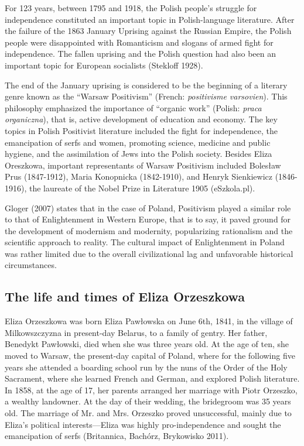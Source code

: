 For 123 years, between 1795 and 1918, the Polish people's struggle for independence constituted an important topic in Polish-language literature.
After the failure of the 1863 January Uprising against the Russian Empire, the Polish people were disappointed with Romanticism and slogans of armed fight for independence.
The fallen uprising and the Polish question had also been an important topic for European socialists
(Stekloff 1928).

The end of the January uprising is considered to be the beginning of a literary genre known as the ``Warsaw Positivism'' (French: \textit{positivisme varsovien}).
This philosophy emphasized the importance of ``organic work'' (Polish: \textit{praca organiczna}), that is, active development of education and economy.
The key topics in Polish Positivist literature included the fight for independence, the emancipation of serfs and women, promoting science, medicine and public hygiene, and the assimilation of Jews into the Polish society.
Besides Eliza Oreszkowa, important representants of Warsaw Positivism included Bolesław Prus (1847-1912), Maria Konopnicka (1842-1910), and Henryk Sienkiewicz (1846-1916), the laureate of the Nobel Prize in Literature 1905
(eSzkola.pl).

Gloger (2007) states that in the case of Poland, Positivism played a similar role to that of Enlightenment in Western Europe, that is to say, it paved ground for the development of modernism and modernity, popularizing rationalism and the scientific approach to reality. The cultural impact of Enlightenment in Poland was rather limited due to the overall civilizational lag and unfavorable historical circumstances.

\subsection{The life and times of Eliza Orzeszkowa}

Eliza Orzeszkowa was born Eliza Pawłowska on June 6th, 1841, in the village of Milkowszczyzna in present-day Belarus, to a family of gentry. Her father, Benedykt Pawłowski, died when she was three years old. 
At the age of ten, she moved to Warsaw, the present-day capital of Poland, where for the following five years she attended a boarding school run by the nuns of the Order of the Holy Sacrament, where she learned French and German, and explored Polish literature.
In 1858, at the age of 17, her parents arranged her marriage with Piotr Orzeszko, a wealthy landowner.
At the day of their wedding, the bridegroom was 35 years old.
The marriage of Mr. and Mrs. Orzeszko proved unsuccessful, mainly due to Eliza's political interests---Eliza was highly pro-independence and sought the emancipation of serfs (Britannica, Bachórz, Brykowisko 2011).

